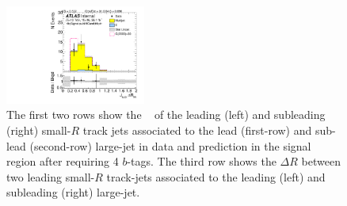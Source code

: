 \begin{figure}[htb!]
\begin{center}
\includegraphics[width=0.41\textwidth,angle=-90]{figures/boosted/Signal/b77_FourTag_Signal_sublHCand_trk_dr.pdf}
  \caption{The first two rows show the \pt~ of the leading (left) and subleading (right) small-$R$ track jets associated to the lead (first-row) and sub-lead (second-row) large-\R jet in data and prediction in the signal region after requiring 4 $b$-tags. The third row shows the $\Delta R$ between two leading small-$R$ track-jets associated to the leading (left) and subleading (right) large-\R jet.  }
  \label{fig:boosted-4b-signal-ak2}
\end{center}
\end{figure}


